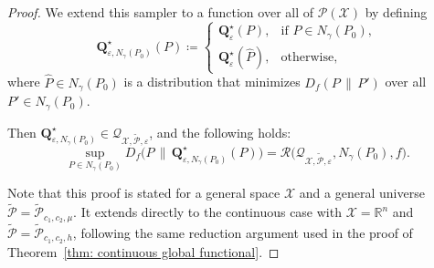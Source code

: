 \documentclass[accepted]{article}
\theoremstyle{plain} %
\theoremstyle{definition}
\theoremstyle{remark}
\newcommand{\bQ}{\mathbf{Q}}
\newcommand{\Pth}
{\tilde{\mathcal{P}}_{c_1, c_2, h}}
\newcommand{\Ptm}
{\tilde{\mathcal{P}}_{c_1, c_2, \mu}}
\begin{document}
\begin{proof}
We extend this sampler to a function over all of \(\mathcal{P}(\mathcal{X})\) by defining
\[
\bQ^\star_{\varepsilon, N_\gamma(P_0)}(P) \coloneqq 
\begin{cases}
\bQ^\star_\varepsilon(P), & \text{if } P \in N_\gamma(P_0), \\[6pt]
\bQ^\star_\varepsilon(\hat{P}), & \text{otherwise},
\end{cases}
\]
where \( \hat{P} \in N_\gamma(P_0) \) is a distribution that minimizes \(  D_f(P \,\|\, P') \) over all $P' \in N_\gamma(P_0)$.

Then \(\bQ^\star_{\varepsilon, N_\gamma(P_0)} \in \mathcal{Q}_{\mathcal{X}, \tilde{\mathcal{P}}, \varepsilon}\), and the following holds:
\begin{equation*}
\sup_{P \in N_\gamma(P_0)} 
D_f\big(P \,\|\, \bQ^\star_{\varepsilon, N_\gamma(P_0)}(P)\big)
= 
\mathcal{R}\Big(\mathcal{Q}_{\mathcal{X}, \tilde{\mathcal{P}}, \varepsilon}, N_\gamma(P_0), f\Big).
\end{equation*}



Note that this proof is stated for a general space \(\mathcal{X}\) and a general universe \(\tilde{\mathcal{P}} = \Ptm\). It extends directly to the continuous case with \(\mathcal{X} = \mathbb{R}^n\) and \(\tilde{\mathcal{P}} = \Pth\), following the same reduction argument used in the proof of Theorem~\ref{thm: continuous global functional}.
\end{proof}
\end{document}

